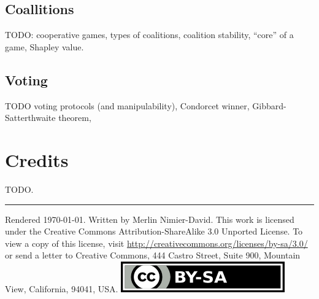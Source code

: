 \documentclass[10pt,a4paper,landscape]{article}
\begin{document}
\begin{multicols*}{4}
\subsection{Coallitions}

TODO: cooperative games, types of coalitions, coalition stability, ``core'' of a game, Shapley value.

\subsection{Voting}

TODO voting protocols (and manipulability), Condorcet winner, Gibbard-Satterthwaite theorem,



\section{Credits}
TODO.

\hrule
\tiny
Rendered \today. Written by Merlin Nimier-David.
This work is licensed under the Creative Commons Attribution-ShareAlike 3.0 Unported License.
To view a copy of this license, visit \href{http://creativecommons.org/licenses/by-sa/3.0/}{http://creativecommons.org/licenses/by-sa/3.0/} or
send a letter to Creative Commons, 444 Castro Street, Suite 900, Mountain View, California, 94041, USA.
\includegraphics{images/by-sa.png}

\end{multicols*}
\end{document}
